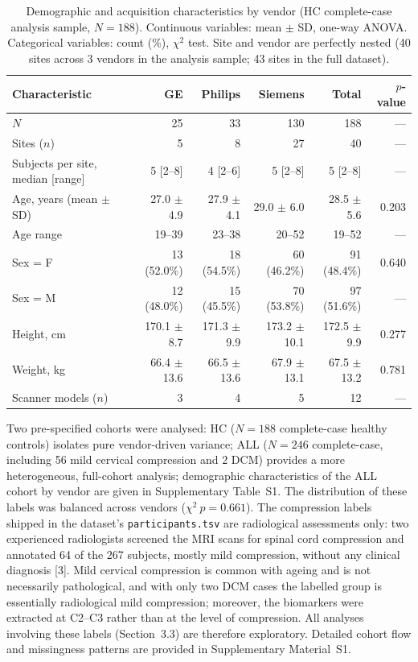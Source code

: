 \documentclass[12pt,a4paper]{article}
\begin{document}
\begin{table}[H]
\centering
\small
\setlength{\tabcolsep}{4pt}
\caption{Demographic and acquisition characteristics by vendor (HC complete-case analysis sample, $N=188$). Continuous variables: mean $\pm$ SD, one-way ANOVA. Categorical variables: count (\%), $\chi^{2}$ test. Site and vendor are perfectly nested (40 sites across 3 vendors in the analysis sample; 43 sites in the full dataset).}
\label{tab:demographics}
\begin{tabular}{lrrrrr}
\toprule
Characteristic & GE & Philips & Siemens & Total & $p$-value \\
\midrule
$N$ & 25 & 33 & 130 & 188 & --- \\
Sites ($n$) & 5 & 8 & 27 & 40 & --- \\
Subjects per site, median [range] & 5 [2--8] & 4 [2--6] & 5 [2--8] & 5 [2--8] & --- \\
Age, years (mean $\pm$ SD) & 27.0 $\pm$ 4.9 & 27.9 $\pm$ 4.1 & 29.0 $\pm$ 6.0 & 28.5 $\pm$ 5.6 & 0.203 \\
Age range & 19--39 & 23--38 & 20--52 & 19--52 & --- \\
Sex = F & 13 (52.0\%) & 18 (54.5\%) & 60 (46.2\%) & 91 (48.4\%) & 0.640 \\
Sex = M & 12 (48.0\%) & 15 (45.5\%) & 70 (53.8\%) & 97 (51.6\%) & --- \\
Height, cm & 170.1 $\pm$ 8.7 & 171.3 $\pm$ 9.9 & 173.2 $\pm$ 10.1 & 172.5 $\pm$ 9.9 & 0.277 \\
Weight, kg & 66.4 $\pm$ 13.6 & 66.5 $\pm$ 13.6 & 67.9 $\pm$ 13.1 & 67.5 $\pm$ 13.2 & 0.781 \\
Scanner models ($n$) & 3 & 4 & 5 & 12 & --- \\
\bottomrule
\end{tabular}
\end{table}

Two pre-specified cohorts were analysed: HC ($N=188$ complete-case healthy controls) isolates pure vendor-driven variance; ALL ($N=246$ complete-case, including 56 mild cervical compression and 2 DCM) provides a more heterogeneous, full-cohort analysis; demographic characteristics of the ALL cohort by vendor are given in Supplementary Table~S1. The distribution of these labels was balanced across vendors ($\chi^2\ p=0.661$). The compression labels shipped in the dataset's \texttt{participants.tsv} are radiological assessments only: two experienced radiologists screened the MRI scans for spinal cord compression and annotated 64 of the 267 subjects, mostly mild compression, without any clinical diagnosis [3]. Mild cervical compression is common with ageing and is not necessarily pathological, and with only two DCM cases the labelled group is essentially radiological mild compression; moreover, the biomarkers were extracted at C2--C3 rather than at the level of compression. All analyses involving these labels (Section~3.3) are therefore exploratory. Detailed cohort flow and missingness patterns are provided in Supplementary Material~S1.
\end{document}
